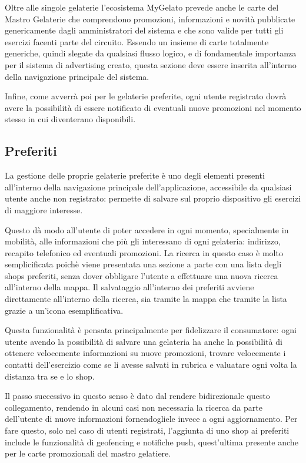 Oltre alle singole gelaterie l'ecosistema MyGelato prevede anche le
carte del Mastro Gelaterie che comprendono promozioni, informazioni
e novità pubblicate genericamente dagli amministratori del sistema
e che sono valide per tutti gli esercizi facenti parte del circuito.
Essendo un insieme di carte totalmente generiche, quindi slegate da
qualsiasi flusso logico, e di fondamentale importanza per il sistema
di advertising creato, questa sezione deve essere inserita all'interno
della navigazione principale del sistema.\bigskip{}

Infine, come avverrà poi per le gelaterie preferite, ogni utente registrato
dovrà avere la possibilità di essere notificato di eventuali nuove
promozioni nel momento stesso in cui diventerano disponibili.

\subsection{Preferiti}

La gestione delle proprie gelaterie preferite è uno degli elementi
presenti all'interno della navigazione principale dell'applicazione,
accessibile da qualsiasi utente anche non registrato: permette di
salvare sul proprio dispositivo gli esercizi di maggiore interesse.

Questo dà modo all'utente di poter accedere in ogni momento, specialmente
in mobilità, alle informazioni che più gli interessano di ogni gelateria:
indirizzo, recapito telefonico ed eventuali promozioni. La ricerca
in questo caso è molto semplicificata poichè viene presentata una
sezione a parte con una lista degli shops preferiti, senza dover obbligare
l'utente a effettuare una nuova ricerca all'interno della mappa. Il
salvataggio all'interno dei preferiti avviene direttamente all'interno
della ricerca, sia tramite la mappa che tramite la lista grazie a
un'icona esemplificativa.\bigskip{}

Questa funzionalità è pensata principalmente per fidelizzare il consumatore:
ogni utente avendo la possibilità di salvare una gelateria ha anche
la possibilità di ottenere velocemente informazioni su nuove promozioni,
trovare velocemente i contatti dell'esercizio come se li avesse salvati
in rubrica e valuatare ogni volta la distanza tra se e lo shop.\bigskip{}

Il passo successivo in questo senso è dato dal rendere bidirezionale
questo collegamento, rendendo in alcuni casi non necessaria la ricerca
da parte dell'utente di nuove informazioni fornendogliele invece a
ogni aggiornamento. Per fare questo, solo nel caso di utenti registrati,
l'aggiunta di uno shop ai preferiti include le funzionalità di geofencing
e notifiche push, quest'ultima presente anche per le carte promozionali
del mastro gelatiere.

